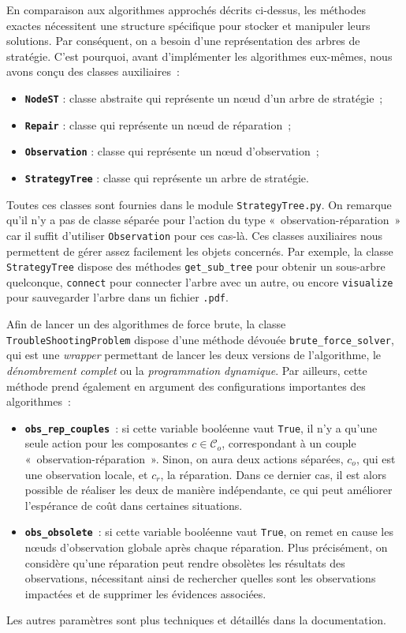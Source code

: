 \documentclass[a4paper,11pt]{article}
\theoremstyle{plain}
\theoremstyle{definition}
\begin{document}
En comparaison aux algorithmes approchés décrits ci-dessus, les méthodes exactes nécessitent une structure spécifique pour stocker et manipuler leurs solutions. Par conséquent, on a besoin d'une représentation des arbres de stratégie. C'est pourquoi, avant d'implémenter les algorithmes eux-mêmes, nous avons conçu des classes auxiliaires~:
\begin{itemize}
    \item \texttt{\textbf{NodeST}} : classe abstraite qui représente un nœud d'un arbre de stratégie~;
    \item \texttt{\textbf{Repair}} : classe qui représente un nœud de réparation~;
    \item \texttt{\textbf{Observation}} : classe qui représente un nœud d'observation~;
    \item \texttt{\textbf{StrategyTree}} : classe qui représente un arbre de stratégie.
\end{itemize}
Toutes ces classes sont fournies dans le module \texttt{StrategyTree.py}. On remarque qu'il n'y a pas de classe séparée pour l'action du type «~observation-réparation~» car il suffit d'utiliser \texttt{Observation} pour ces cas-là. Ces classes auxiliaires nous permettent de gérer assez facilement les objets concernés. Par exemple, la classe \texttt{StrategyTree} dispose des méthodes \texttt{get\_sub\_tree} pour obtenir un sous-arbre quelconque, \texttt{connect} pour connecter l'arbre avec un autre, ou encore \texttt{visualize} pour sauvegarder l'arbre dans un fichier \texttt{.pdf}.

Afin de lancer un des algorithmes de force brute, la classe \texttt{TroubleShootingProblem} dispose d'une méthode dévouée \texttt{brute\_force\_solver}, qui est une \emph{wrapper} permettant de lancer les deux versions de l'algorithme, le \emph{dénombrement complet} ou la \emph{programmation dynamique}. Par ailleurs, cette méthode prend également en argument des configurations importantes des algorithmes~:
\begin{itemize}
    \item \texttt{\textbf{obs\_rep\_couples}}~: si cette variable booléenne vaut \texttt{True}, il n'y a qu'une seule action pour les composantes $c \in \mathcal C_o$, correspondant à un couple «~observation-réparation~». Sinon, on aura deux actions séparées, $c_o$, qui est une observation locale, et $c_r$, la réparation. Dans ce dernier cas, il est alors possible de réaliser les deux de manière indépendante, ce qui peut améliorer l'espérance de coût dans certaines situations.	
    \item \texttt{\textbf{obs\_obsolete}}~: si cette variable booléenne vaut \texttt{True}, on remet en cause les nœuds d'observation globale après chaque réparation. Plus précisément, on considère qu'une réparation peut rendre obsolètes les résultats des observations, nécessitant ainsi de rechercher quelles sont les observations impactées et de supprimer les évidences associées.
\end{itemize}
Les autres paramètres sont plus techniques et détaillés dans la documentation.
\end{document}
